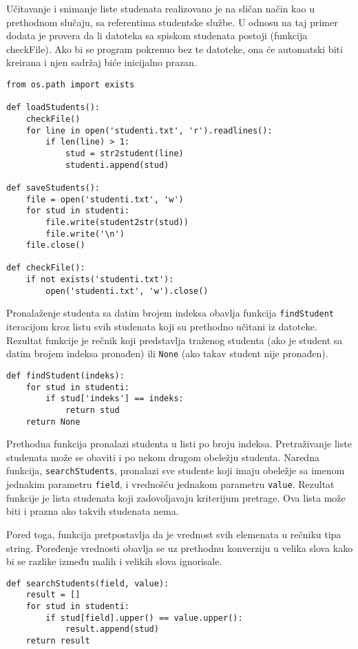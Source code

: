 \documentclass[a4paper]{article}
\begin{document}
Učitavanje i snimanje liste studenata realizovano je na sličan način kao u
prethodnom slučaju, sa referentima studentske službe. U odnosu na taj primer
dodata je provera da li datoteka sa spiskom studenata postoji (funkcija
checkFile). Ako bi se program pokrenuo bez te datoteke, ona će automatski biti
kreirana i njen sadržaj biće inicijalno prazan.

\begin{verbatim}
from os.path import exists

def loadStudents():
    checkFile()
    for line in open('studenti.txt', 'r').readlines():
        if len(line) > 1:
            stud = str2student(line)
            studenti.append(stud)

def saveStudents():
    file = open('studenti.txt', 'w')
    for stud in studenti:
        file.write(student2str(stud))
        file.write('\n')
    file.close()
    
def checkFile():
    if not exists('studenti.txt'):
        open('studenti.txt', 'w').close()
\end{verbatim}

Pronalaženje studenta sa datim brojem indeksa obavlja funkcija
\texttt{findStudent} iteracijom kroz listu svih studenata koji su prethodno
učitani iz datoteke. Rezultat funkcije je rečnik koji predstavlja traženog
studenta (ako je student sa datim brojem indeksa pronađen) ili \texttt{None}
(ako takav student nije pronađen).

\begin{verbatim}
def findStudent(indeks):
    for stud in studenti:
        if stud['indeks'] == indeks:
            return stud
    return None
\end{verbatim}

Prethodna funkcija pronalazi studenta u listi po broju indeksa. Pretraživanje
liste studenata može se obaviti i po nekom drugom obeležju studenta. Naredna
funkcija, \texttt{searchStudents}, pronalazi sve studente koji imaju obeležje sa
imenom jednakim parametru \texttt{field}, i vrednošću jednakom parametru
\texttt{value}. Rezultat funkcije je lista studenata koji zadovoljavaju
kriterijum pretrage. Ova lista može biti i prazna ako takvih studenata nema.

Pored toga, funkcija pretpostavlja da je vrednost svih elemenata u rečniku tipa
string. Poređenje vrednosti obavlja se uz prethodnu konverziju u velika slova
kako bi se razlike između malih i velikih slova ignorisale.

\begin{verbatim}
def searchStudents(field, value):
    result = []
    for stud in studenti:
        if stud[field].upper() == value.upper():
            result.append(stud)
    return result
\end{verbatim}
\end{document}
